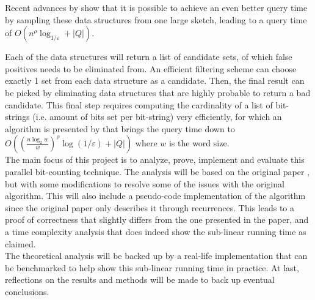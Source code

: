 Recent advances by \citet{fast-similarity-search} show that it is possible to achieve an even better query time by sampling these data structures from one large sketch, leading to a query time of $O(n^\rho \log_{1/\varepsilon} + |Q|)$.

Each of the data structures will return a list of candidate sets, of which false positives needs to be eliminated from. An efficient filtering scheme can choose exactly 1 set from each data structure as a candidate. Then, the final result can be picked by eliminating data structures that are highly probable to return a bad candidate. This final step requires computing the cardinality of a list of bit-strings (i.e. amount of bits set per bit-string) very efficiently, for which an algorithm is presented by \citet{fast-similarity-search} that brings the query time down to $O((\frac{n\log_2 w}{w})^\rho \log(1/\varepsilon) + |Q|)$ where $w$ is the word size.\\
The main focus of this project is to analyze, prove, implement and evaluate this parallel bit-counting technique. The analysis will be based on the original paper \cite{fast-similarity-search}, but with some modifications to resolve some of the issues with the original algorithm. This will also include a pseudo-code implementation of the algorithm since the original paper only describes it through recurrences. This leads to a proof of correctness that slightly differs from the one presented in the paper, and a time complexity analysis that does indeed show the sub-linear running time as claimed.\\
The theoretical analysis will be backed up by a real-life implementation that can be benchmarked to help show this sub-linear running time in practice. At last, reflections on the results and methods will be made to back up eventual conclusions.

